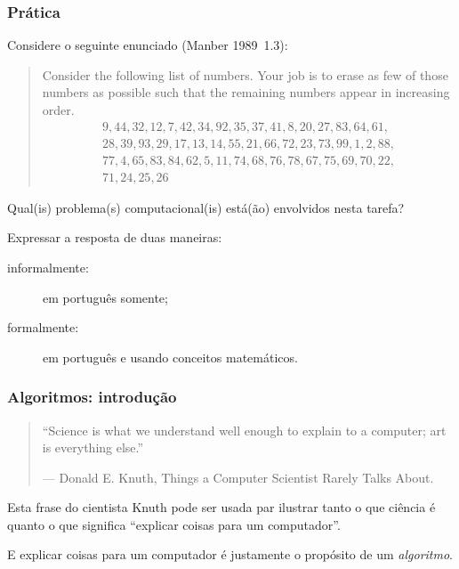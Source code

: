 \documentclass{beamer}
\begin{document}
\begin{frame}
  \frametitle{Prática}

  Considere o seguinte enunciado (Manber 1989~1.3):

  \begin{quote}
    Consider the following list of numbers. Your job is to erase as few of those numbers as 
    possible such that the remaining numbers appear in increasing order. 
    \[
    \begin{array}{l}
    9, 44, 32, 12, 7, 42, 34, 92, 35, 37, 41, 8, 20, 27, 83, 64, 61, \\
    28, 39, 93, 29, 17, 13, 14, 55, 21, 66, 72, 23, 73, 99, 1, 2, 88, \\
    77, 4, 65, 83, 84, 62, 5, 11, 74, 68, 76, 78, 67, 75, 69, 70, 22, \\
    71, 24, 25, 26
    \end{array}
    \]
  \end{quote}

  
  Qual(is) problema(s) computacional(is) está(ão) envolvidos nesta tarefa? 

  Expressar a resposta de duas maneiras:
  \begin{description}
  \item[informalmente:] em português somente;
  \item[formalmente:] em português e usando conceitos matemáticos.
  \end{description}
  
\end{frame}

\begin{frame}
  \frametitle{Algoritmos: introdução}

  \begin{quotation}
    ``Science is what we understand well enough to explain to a computer; art is
    everything else.''

    --- Donald E. Knuth, Things a Computer Scientist Rarely Talks About.
  \end{quotation}

  Esta frase do cientista Knuth pode ser usada par ilustrar tanto o
  que ciência é quanto o que significa ``explicar coisas para um
  computador''.

  E explicar coisas para um computador é justamente o propósito de um 
  \emph{algoritmo}.

\end{frame}
\end{document}
